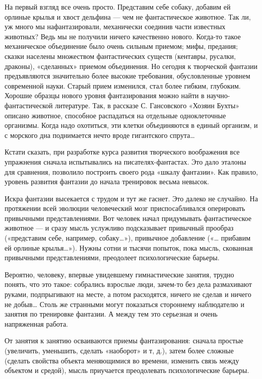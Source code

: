 На  первый взгляд  все очень  просто. Представим  себе собаку,  добавим ей
орлиные  крылья и  хвост дельфина  — чем  не фантастическое  животное. Так
ли,  уж много  мы  нафантазировали, механически  соединив части  известных
животных? Ведь  мы не получили  ничего качественно нового.  Когда-то такое
механическое  объединение  было  очень сильным  приемом;  мифы,  предания;
сказки  населены  множеством  фантастических существ  (кентавры,  русалки,
драконы),  «сделанных»  приемом  объединения.   Но  сегодня  к  творческой
фантазии предъявляются значительно более высокие требования, обусловленные
уровнем  современной науки.  Старый  прием изменился,  стал более  гибким,
глубоким.  Хорошие  образцы нового  уровня  фантазирования  можно найти  в
научно-фантастической литературе.  Так, в рассказе С.  Гансовского «Хозяин
Бухты» описано животное, способное  распадаться на отдельные одноклеточные
организмы.  Когда  надо  охотиться,   эти  клетки  объединяются  в  единый
организм, и с морского дна поднимается нечто вроде гигантского спрута…

Кстати сказать, при разработке курса развития творческого воображения  все
упражнения сначала испытывались на  писателях-фантастах. Это дало  эталоны
для сравнения,  позволило  построить  своего рода  «шкалу  фантазии».  Как
правило, уровень развития фантазии до начала тренировок весьма невысок.

Искра фантазии  высекается  с  трудом  и тут  же  гаснет.  Это  далеко  не
случайно. На протяжении всей  эволюции человеческий мозг  приспосабливался
оперировать привычными  представлениями.  Вот  человек  начал  придумывать
фантастическое животное — и  сразу мысль услужливо подсказывает  привычный
прообраз («представим себе, например, собаку…»), привычное добавление  («…
прибавим ей орлиные крылья…»). Нужны  сотни и тысячи попыток, пока  мысль,
скованная привычными представлениями, преодолеет психологические барьеры.

Вероятно, человеку,  впервые  увидевшему  гимнастические  занятия,  трудно
понять,  что  это  такое:  собрались  взрослые  люди,  зачем-то  без  дела
размахивают руками, подпрыгивают на месте,  а потом расходятся, ничего  не
сделав и ничего не добыв…  Столь же странными могут показаться  стороннему
наблюдателю и занятия по тренировке фантазии. А между тем это серьезная  и
очень напряженная работа.

От занятия к  занятию осваиваются приемы  фантазирования: сначала  простые
(увеличить, уменьшить, сделать  «наоборот» и т,  д.), затем более  сложные
(сделать свойства  объекта меняющимися  во времени,  изменить связь  между
объектом и средой), мысль приучается преодолевать психологические барьеры.

